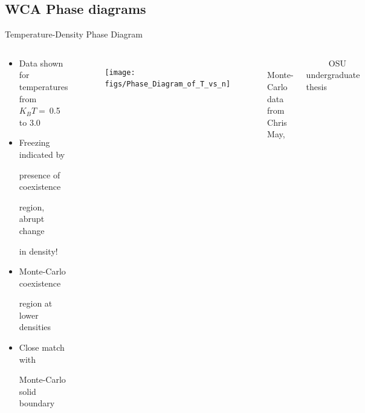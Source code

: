 \documentclass{beamer}
\begin{document}
\subsection*{WCA Phase diagrams}

\begin{frame}{Temperature-Density Phase Diagram}
\begin{columns}
	    \vspace{-2em}
        \begin{block}{}
            \begin{itemize}
              \item Data shown for temperatures from $K_BT=~$0.5 to 3.0
              \item Freezing indicated by 
            
               presence of coexistence
            
               region, abrupt change 
            
               in density!
              \item Monte-Carlo coexistence 
              
              region at lower densities
              
              \item Close match with 
              
              Monte-Carlo solid boundary
            \end{itemize}
            \end{block}
    \begin{figure}
        \centering
        \texttt{[image: figs/Phase\_Diagram\_of\_T\_vs\_n]}\\
    \end{figure}        
    \vspace{-1em}
    \footnotesize $~~~~~~~~~~~~$Monte-Carlo data from Chris May, 
    
     $~~~~~~~~~~~~$OSU undergraduate thesis
     \normalsize
     \end{columns}
\end{frame}
\end{document}
